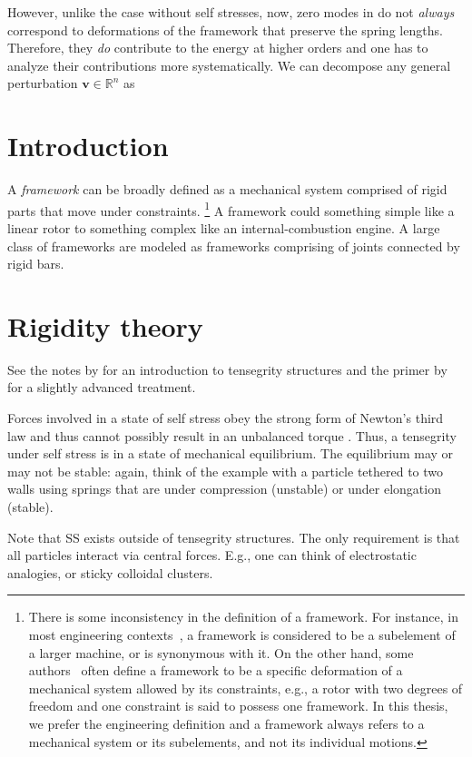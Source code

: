 However, unlike the case without self stresses, now, zero modes in do not \emph{always} correspond to deformations of the framework that preserve the spring lengths.
Therefore, they \emph{do} contribute to the energy at higher orders and one has to analyze their contributions more systematically.
We can decompose any general perturbation $\bm{v} \in \mathbb{R}^n$ as

\section{Introduction}

A \emph{framework} can be broadly defined as a mechanical system comprised of rigid parts that move under constraints.%
\footnote{There is some inconsistency in the definition of a framework.
  For instance, in most engineering contexts~\cite{hartenberg1964,hunt1978,myszka2012}, a framework is considered to be a subelement of a larger machine, or is synonymous with it.
  On the other hand, some authors~\cite{connelly2022} often define a framework to be a specific deformation of a mechanical system allowed by its constraints, e.g., a rotor with two degrees of freedom and one constraint is said to possess one framework.
  In this thesis, we prefer the engineering definition and a framework always refers to a mechanical system or its subelements, and not its individual motions.}
A framework could something simple like a linear rotor to something complex like an internal-combustion engine.
A large class of frameworks are modeled as frameworks comprising of joints connected by rigid bars.

\section{Rigidity theory}

See the notes by \citet{connelly2022} for an introduction to tensegrity structures and the primer by \citet{williams2003} for a slightly advanced treatment.

Forces involved in a state of self stress obey the strong form of Newton's third law and thus cannot possibly result in an unbalanced torque \cite[\S 1.2]{goldstein2002}.
Thus, a tensegrity under self stress is in a state of mechanical equilibrium.
The equilibrium may or may not be stable: again, think of the example with a particle tethered to two walls using springs that are under compression (unstable) or under elongation (stable).

Note that SS exists outside of tensegrity structures.
The only requirement is that all particles interact via central forces.
E.g., one can think of electrostatic analogies, or sticky colloidal clusters.

